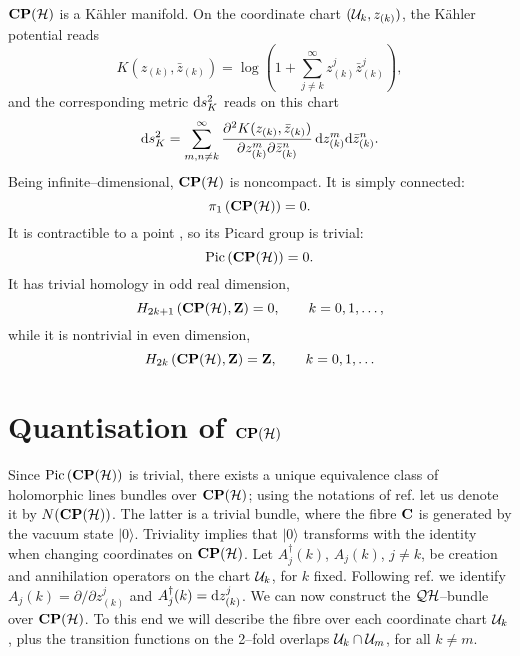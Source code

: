 \documentclass[a4paper,a4paper]{article}
\begin{document}
${\bf CP}({\cal H})$ is a K\"ahler manifold. On the coordinate chart $({\cal 
U}_k, z_{(k)})$, the K\"ahler potential reads
\begin{equation}
K(z_{(k)}, {\bar z}_{(k)})=
\log{\left(1 + \sum_{j\neq k}^{\infty} z^j_{(k)} {\bar z}^j_{(k)}\right)},
\label{fubst}
\end{equation} 
and the corresponding metric ${\rm d}s^2_K$ reads on this chart
\begin{equation}
{\rm d}s^2_K = \sum_{m,n\neq k}^{\infty}{\partial^2 K(z_{(k)}, {\bar z}_{(k)})\over
\partial z_{(k)}^m \partial {\bar z}_{(k)}^n}\, {\rm d}z_{(k)}^m{\rm d}{\bar z}_{(k)}^n.
\label{rrdd}
\end{equation}
Being infinite--dimensional, ${\bf CP}({\cal H})$ is noncompact. It is simply connected:
\begin{equation}
\pi_1\left({\bf CP}({\cal H})\right)=0.
\label{cphx}
\end{equation}
It is contractible to a point \cite{KUIPER}, so its Picard group is trivial:
\begin{equation}
{\rm Pic}\, ({\bf CP}({\cal H}))=0.
\label{ppic}
\end{equation}
It has trivial homology in odd real dimension,
\begin{equation}
H_{2k+1}\left({\bf CP}({\cal H}), {\bf Z}\right)=0,\qquad k=0,1,\ldots,
\label{cotri}
\end{equation}
while it is nontrivial in even dimension,
\begin{equation}
H_{2k}\left({\bf CP}({\cal H}), {\bf Z}\right)={\bf Z}, \qquad k=0,1,\ldots
\label{pelotudo}
\end{equation}


\section{Quantisation of ${\bf CP}({\cal H})$}\label{cepehache}


Since ${\rm Pic}\,({\bf CP}({\cal H}))$ is trivial, there exists a unique equivalence class 
of holomorphic lines bundles over ${\bf CP}({\cal H})$; using the notations of ref. \cite{PQM} 
let us denote it by $N({\bf CP}({\cal H}))$. The latter is a trivial bundle, 
where the fibre ${\bf C}$ is generated by the vacuum state $\vert 0\rangle$.
Triviality implies that $\vert 0\rangle$ transforms with the identity when changing coordinates 
on ${\bf CP}({\cal H})$. Let $A^{\dagger}_j(k)$, $A_j(k)$, $j\neq k$, 
be creation and annihilation operators on the chart ${\cal U}_k$, for $k$ fixed. 
Following ref. \cite{PQM} we identify $A_j(k)=\partial/\partial z^j_{(k)}$ and 
$A^{\dagger}_j(k)={\rm d}z^j_{(k)}$. We can now construct the ${\cal QH}$--bundle over 
${\bf CP}({\cal H})$. To this end we will describe the fibre over each coordinate chart 
${\cal U}_k$, plus the transition functions on the 2--fold overlaps ${\cal U}_k\cap {\cal U}_m$, 
for all $k\neq m$. 
\end{document}
